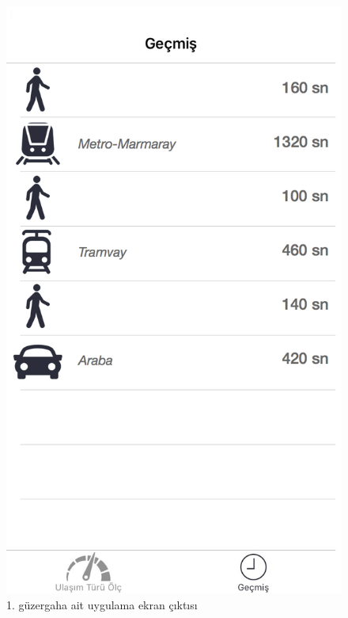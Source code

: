 \begin{figure}[!htbp]
\centering
\includegraphics[scale=0.2]{projectChapters/images/rota_2.png}
\caption{1. güzergaha ait uygulama ekran çıktısı}
\end{figure}

